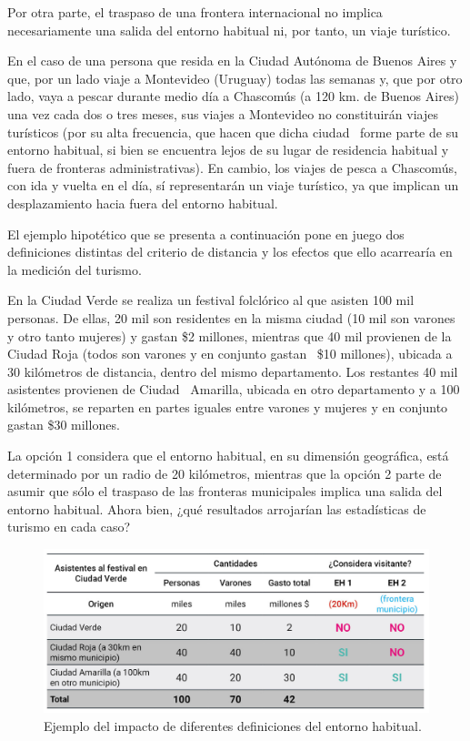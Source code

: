 \documentclass[
]{book}
\begin{document}
Por otra parte, el traspaso de una frontera internacional no implica necesariamente una salida del entorno habitual ni, por tanto, un viaje turístico.~

En el caso de una persona que resida en la Ciudad Autónoma de Buenos Aires y que, por un lado viaje a Montevideo (Uruguay) todas las semanas y, que por otro lado, vaya a pescar durante medio día a Chascomús (a 120 km. de Buenos Aires) una vez cada dos o tres meses, sus viajes a Montevideo no constituirán viajes turísticos (por su alta frecuencia, que hacen que dicha ciudad~ forme parte de su entorno habitual, si bien se encuentra lejos de su lugar de residencia habitual y fuera de fronteras administrativas). En cambio, los viajes de pesca a Chascomús, con ida y vuelta en el día, sí representarán un viaje turístico, ya que implican un desplazamiento hacia fuera del entorno habitual.

El ejemplo hipotético que se presenta a continuación pone en juego dos definiciones distintas del criterio de distancia y los efectos que ello acarrearía en la medición del turismo.

En la Ciudad Verde se realiza un festival folclórico al que asisten 100 mil personas. De ellas, 20 mil son residentes en la misma ciudad (10 mil son varones y otro tanto mujeres) y gastan \$2 millones, mientras que 40 mil provienen de la Ciudad Roja (todos son varones y en conjunto gastan~ \$10 millones), ubicada a 30 kilómetros de distancia, dentro del mismo departamento. Los restantes 40 mil asistentes provienen de Ciudad~ Amarilla, ubicada en otro departamento y a 100 kilómetros, se reparten en partes iguales entre varones y mujeres y en conjunto gastan \$30 millones.

La opción 1 considera que el entorno habitual, en su dimensión geográfica, está determinado por un radio de 20 kilómetros, mientras que la opción 2 parte de asumir que sólo el traspaso de las fronteras municipales implica una salida del entorno habitual. Ahora bien, ¿qué resultados arrojarían las estadísticas de turismo en cada caso?

\begin{figure}

{\centering \includegraphics[width=0.8\linewidth]{imagenes/figura1.2} 

}

\caption{Ejemplo del impacto de diferentes definiciones del entorno habitual.}\label{fig:entorno}
\end{figure}
\end{document}
